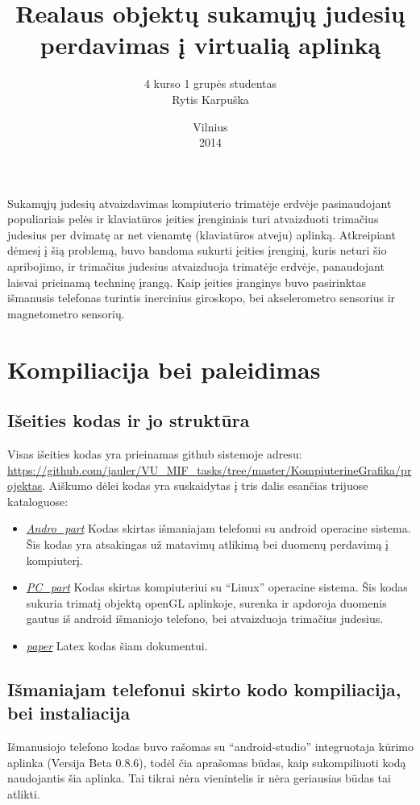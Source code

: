 \documentclass[12pt, a4paper, lithuanian, final]{article}
\title{Realaus objektų sukamųjų judesių perdavimas į virtualią aplinką}
\author{
    4 kurso 1 grupės studentas \\
    Rytis Karpuška
}
\date{Vilnius \\
	2014}
\begin{document}
\maketitle


Sukamųjų judesių atvaizdavimas kompiuterio trimatėje erdvėje pasinaudojant populiariais pelės ir klaviatūros įeities įrenginiais turi atvaizduoti trimačius judesius per dvimatę ar net vienamtę (klaviatūros atveju) aplinką.
Atkreipiant dėmesį į šią problemą, buvo bandoma sukurti įeities įrenginį, kuris neturi šio apribojimo, ir trimačius judesius atvaizduoja trimatėje erdvėje, panaudojant laisvai prieinamą techninę įrangą.
Kaip įeities įranginys buvo pasirinktas išmanusis telefonas turintis inercinius giroskopo, bei akselerometro sensorius ir magnetometro sensorių.



\section{Kompiliacija bei paleidimas}

\subsection{Išeities kodas ir jo struktūra}
Visas išeities kodas yra prieinamas github sistemoje adresu: \url{https://github.com/jauler/VU_MIF_tasks/tree/master/KompiuterineGrafika/projektas}.
Aiškumo dėlei kodas yra suskaidytas į tris dalis esančias trijuose kataloguose:
\begin{itemize}
	\item \textit{\url{Andro_part}} Kodas skirtas išmaniajam telefonui su android operacine sistema.
		Šis kodas yra atsakingas už matavimų atlikimą bei duomenų perdavimą į kompiuterį.
	\item \textit{\url{PC_part}} Kodas skirtas kompiuteriui su "`Linux"' operacine sistema.
		Šis kodas sukuria trimatį objektą openGL aplinkoje, surenka ir apdoroja duomenis gautus iš android išmaniojo telefono, bei atvaizduoja trimačius judesius.
	\item \textit{\url{paper}} Latex kodas šiam dokumentui.
\end{itemize}

\subsection{Išmaniajam telefonui skirto kodo kompiliacija, bei instaliacija}
Išmanusiojo telefono kodas buvo rašomas su "`android-studio"' integruotaja kūrimo aplinka (Versija Beta 0.8.6), todėl čia aprašomas būdas, kaip sukompiliuoti kodą naudojantis šia aplinka.
Tai tikrai nėra vienintelis ir nėra geriausias būdas tai atlikti.
\end{document}
